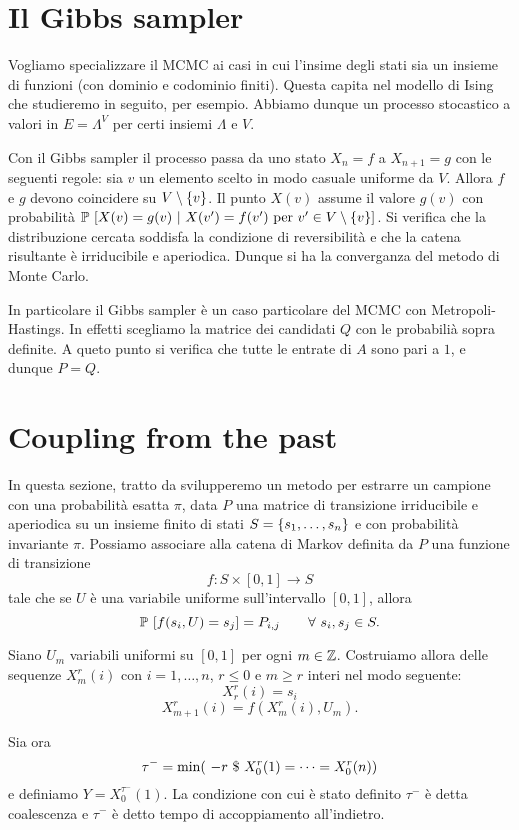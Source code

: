 \documentclass[]{marticle}
\begin{document}
\section{Il Gibbs sampler}

Vogliamo specializzare il MCMC ai casi in cui l'insime degli stati sia un
insieme di funzioni (con dominio e codominio finiti). Questa capita nel modello
di Ising che studieremo in seguito, per esempio. Abbiamo dunque un processo
stocastico a valori in $E=\Lambda^V$ per certi insiemi $\Lambda$ e $V$. 

Con il Gibbs sampler il processo passa da uno stato $X_n=f$ a $X_{n+1}=g$ con le
seguenti regole: sia $v$ un elemento scelto in modo casuale uniforme da $V$.
Allora $f$ e $g$ devono coincidere su $V\setminus\{v\}$. Il punto $X(v)$
assume il valore $g(v)$ con probabilit\`a $\prob{X(v)=g(v) \ |\ X(v')=f(v')
\text{ per } v' \in V\setminus\setof{v}}$. Si verifica che la distribuzione
cercata soddisfa la condizione di reversibilit\`a e che la catena risultante \`e
irriducibile e aperiodica. Dunque si ha la converganza del metodo di Monte
Carlo.

In particolare il Gibbs sampler \`e un caso particolare del MCMC con
Metropoli-Hastings. In effetti scegliamo la matrice dei candidati $Q$ con le
probabili\`a sopra definite. A queto punto si verifica che tutte le entrate di
$A$ sono pari a $1$, e dunque $P=Q$.

\section{Coupling from the past}

In questa sezione, tratto da \cite{haggstrom} svilupperemo un metodo per
estrarre un campione con una probabilit\`a esatta $\pi$, data $P$ una matrice di
transizione irriducibile e aperiodica su un insieme finito di stati
$S=\{s_1,\dots,s_n\}$ e con probabilit\`a invariante $\pi$. Possiamo
associare alla catena di Markov definita da $P$ una funzione di transizione 
\[
    f\colon S\times [0,1] \longrightarrow S
\]
tale che se $U$ \`e una variabile uniforme sull'intervallo $[0,1]$, allora 
\[
    \prob{f(s_i,U)=s_j}=P_{i,j} \qquad \forall s_i,s_j \in S.
\]

Siano $U_m$ variabili uniformi su $[0,1]$ per ogni $m\in \mathbb{Z}$. Costruiamo allora
delle sequenze $X^r_m(i)$ con $i = 1,\dots,n$, $r\leq 0$ e $m \geq r$ interi nel
modo seguente:
\[
    X^r_r(i) = s_i
\]
\[
    X^r_{m+1}(i) = f(X^r_m(i), U_m).
\]

Sia ora 
\[
    \tau^-=\min(\ -r \ \$\  X^r_0(1) = \dots = X^r_0(n))
\]
e definiamo $Y = X^{\tau^-}_0(1)$. La condizione con cui \`e stato definito
$\tau^-$ \`e detta coalescenza e $\tau^-$ \`e detto tempo di accoppiamento
all'indietro.
\end{document}
